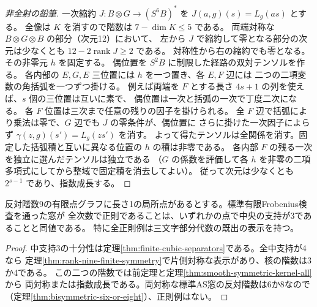 \begin{proof}[非全射の鉛筆]
一次縮約 $J:B\otimes G\to (S^6 B)^*$ を $J(a,g)(s)=L_g(as)$ とする。
全像は $K$ を消すので階数は $7-\dim K\le5$ である。
両端対称な $B\otimes G\otimes B$ の部分（次元12）において、
左から $J$ で縮約して零となる部分の次元は少なくとも $12-2\operatorname{rank}J\ge2$ である。
対称性から右の縮約でも零となる。
その非零元 $h$ を固定する。
偶位置を $S^2 B$ に制限した経路の双対テンソルを作る。
各内部の $E,G,E$ 三位置には $h$ を一つ置き、各 $E,F$ 辺には
二つの二項変数の角括弧を一つずつ掛ける。
例えば両端を $F$ とする長さ $4s+1$ の列を使えば、$s$ 個の三位置は互いに素で、
偶位置は一次と括弧の一次で丁度二次になる。
各 $F$ 位置は三次まで任意の残りの因子を掛けられる。
全 $F$ 辺で括弧により乗法は零で、$G$ 辺でも $J$ の零条件が、偶位置に
さらに掛けた一次因子によらず $\gamma(z,g)(s')=L_g(zs')$ を消す。
よって得たテンソルは全関係を消す。固定した括弧積と互いに異なる位置の $h$ の積は非零である。
各内部 $F$ の残る一次を独立に選んだテンソルは独立である
（$G$ の係数を評価して各 $h$ を非零の二項多項式にしてから整域で固定積を消去してよい）。
従って次元は少なくとも $2^{s-1}$ であり、指数成長する。
\end{proof}

\begin{corollary}\label{cor:rank-nine-simple-ternary-equivalence}
反対階数9の有限点グラフに長さ1の局所点があるとする。標準有限Frobenius検査を通った窓が
全次数で正則であることは、いずれかの点で中央の支持が3であることと同値である。
特に全正則例は三文字部分代数の既出の表示を持つ。
\end{corollary}
\begin{proof}
中支持3の十分性は定理\ref{thm:finite-cubic-separators}である。全中支持が4なら
定理\ref{thm:rank-nine-finite-symmetry}で片側対称な表示があり、核の階数は3か4である。
この二つの階数では前定理と定理\ref{thm:smooth-symmetric-kernel-all}から
両対称または指数成長である。両対称な標準AS窓の反対階数は6か8なので
（定理\ref{thm:bisymmetric-six-or-eight}）、正則例はない。
\end{proof}
